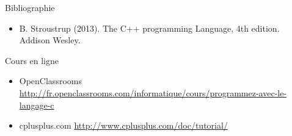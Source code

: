\documentclass[allowframebreaks,xcolor=dvipsnames]{beamer}
\begin{document}
\begin{frame}{Bibliographie}
\begin{itemize}
\item B. Stroustrup (2013). The C++ programming Language, 4th edition. Addison Wesley.
\end{itemize}
\end{frame}

\begin{frame}{Cours en ligne}
\begin{itemize}
\item OpenClassrooms \url{http://fr.openclassrooms.com/informatique/cours/programmez-avec-le-langage-c}
\item cplusplus.com \url{http://www.cplusplus.com/doc/tutorial/}
\end{itemize}
\end{frame}
\end{document}
